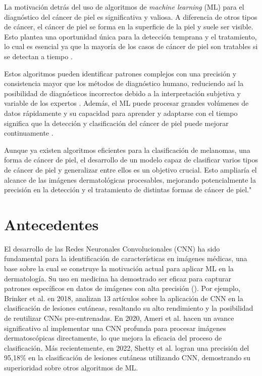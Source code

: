 La motivación detrás del uso de algoritmos de \textit{machine learning} (ML) para el diagnóstico del cáncer de piel es significativa y valiosa. A diferencia de otros tipos de cáncer, el cáncer de piel se forma en la superficie de la piel y suele ser visible. Esto plantea una oportunidad única para la detección temprana y el tratamiento, lo cual es esencial ya que la mayoría de los casos de cáncer de piel son tratables si se detectan a tiempo .

Estos algoritmos pueden identificar patrones complejos con una precisión y consistencia mayor que los métodos de diagnóstico humano, reduciendo así la posibilidad de diagnósticos incorrectos debido a la interpretación subjetiva y variable de los expertos . Además, el ML puede procesar grandes volúmenes de datos rápidamente y su capacidad para aprender y adaptarse con el tiempo significa que la detección y clasificación del cáncer de piel puede mejorar continuamente .

Aunque ya existen algoritmos eficientes para la clasificación de melanomas, una forma de cáncer de piel, el desarrollo de un modelo capaz de clasificar varios tipos de cáncer de piel y generalizar entre ellos es un objetivo crucial. Esto ampliaría el alcance de las imágenes dermatológicas procesables, mejorando potencialmente la precisión en la detección y el tratamiento de distintas formas de cáncer de piel."


\section*{Antecedentes}

El desarrollo de las Redes Neuronales Convolucionales (CNN) ha sido fundamental para la identificación de características en imágenes médicas, una base sobre la cual se construye la motivación actual para aplicar ML en la dermatología. Su uso en medicina ha demostrado ser eficaz para capturar patrones específicos en datos de imágenes con alta precisión (). Por ejemplo, Brinker et al.  en 2018, analizan 13 artículos sobre la aplicación de CNN en la clasificación de lesiones cutáneas, resaltando su alto rendimiento y la posibilidad de reutilizar CNNs pre-entrenadas. En 2020, Ameri et al.  hacen un avance significativo al implementar una CNN profunda para procesar imágenes dermatoscópicas directamente, lo que mejora la eficacia del proceso de clasificación. Más recientemente, en 2022, Shetty et al.  logran una precisión del 95,18\% en la clasificación de lesiones cutáneas utilizando CNN, demostrando su superioridad sobre otros algoritmos de ML.

